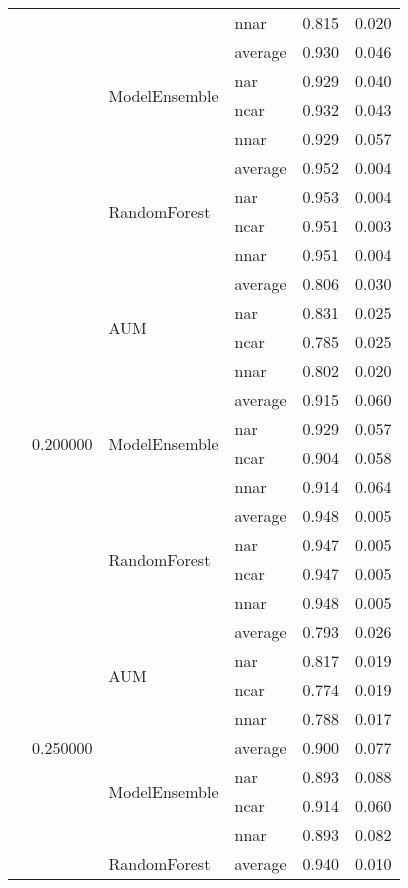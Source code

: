 \begin{longtable}{llllrr}
 &  &  & nnar & 0.815 & 0.020 \\
\cline{3-6}
 &  & \multirow[t]{4}{*}{ModelEnsemble} & average & 0.930 & 0.046 \\
 &  &  & nar & 0.929 & 0.040 \\
 &  &  & ncar & 0.932 & 0.043 \\
 &  &  & nnar & 0.929 & 0.057 \\
\cline{3-6}
 &  & \multirow[t]{4}{*}{RandomForest} & average & 0.952 & 0.004 \\
 &  &  & nar & 0.953 & 0.004 \\
 &  &  & ncar & 0.951 & 0.003 \\
 &  &  & nnar & 0.951 & 0.004 \\
\cline{2-6} \cline{3-6}
 & \multirow[t]{12}{*}{0.200000} & \multirow[t]{4}{*}{AUM} & average & 0.806 & 0.030 \\
 &  &  & nar & 0.831 & 0.025 \\
 &  &  & ncar & 0.785 & 0.025 \\
 &  &  & nnar & 0.802 & 0.020 \\
\cline{3-6}
 &  & \multirow[t]{4}{*}{ModelEnsemble} & average & 0.915 & 0.060 \\
 &  &  & nar & 0.929 & 0.057 \\
 &  &  & ncar & 0.904 & 0.058 \\
 &  &  & nnar & 0.914 & 0.064 \\
\cline{3-6}
 &  & \multirow[t]{4}{*}{RandomForest} & average & 0.948 & 0.005 \\
 &  &  & nar & 0.947 & 0.005 \\
 &  &  & ncar & 0.947 & 0.005 \\
 &  &  & nnar & 0.948 & 0.005 \\
\cline{2-6} \cline{3-6}
 & \multirow[t]{12}{*}{0.250000} & \multirow[t]{4}{*}{AUM} & average & 0.793 & 0.026 \\
 &  &  & nar & 0.817 & 0.019 \\
 &  &  & ncar & 0.774 & 0.019 \\
 &  &  & nnar & 0.788 & 0.017 \\
\cline{3-6}
 &  & \multirow[t]{4}{*}{ModelEnsemble} & average & 0.900 & 0.077 \\
 &  &  & nar & 0.893 & 0.088 \\
 &  &  & ncar & 0.914 & 0.060 \\
 &  &  & nnar & 0.893 & 0.082 \\
\cline{3-6}
 &  & \multirow[t]{4}{*}{RandomForest} & average & 0.940 & 0.010 \\

\end{longtable}
